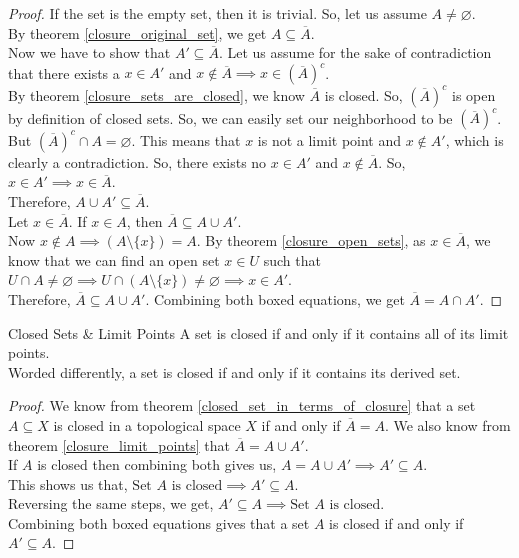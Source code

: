 \begin{proof}
    If the set is the empty set, then it is trivial. So, let us assume $A\neq\varnothing$.\\
    By theorem \eqref{closure_original_set}, we get $A\subseteq \overline{A}$.\\
    Now we have to show that $A'\subseteq \overline{A}$. Let us assume for the sake of contradiction that there exists a $x\in A'$ and $x\notin \overline{A}\implies x\in (\overline{A})^c$.\\ By theorem \eqref{closure_sets_are_closed}, we know $\overline{A}$ is closed. So, $(\overline{A})^c$ is open by definition of closed sets. So, we can easily set our neighborhood to be $(\overline{A})^c$. But $(\overline{A})^c\cap A=\varnothing$. This means that $x$ is not a limit point and $x\notin A'$, which is clearly a contradiction. So, there exists no $x\in A'$ and $x\notin \overline{A}$. So, $x\in A'\implies x\in\overline{A}$.\\
    Therefore, $\boxed{A\cup A'\subseteq\overline{A}}$.\\
    Let $x\in\overline{A}$. If $x\in A$, then $\overline{A}\subseteq A\cup A'$.\\
    Now $x\notin A\implies (A\setminus\{x\})=A$. By theorem \eqref{closure_open_sets}, as $x\in\overline{A}$, we know that we can find an open set $x\in U$ such that $U\cap A\neq\varnothing\implies U\cap(A\setminus\{x\})\neq\varnothing\implies x\in A'$.\\
    Therefore, $\boxed{\overline{A}\subseteq A\cup A'}$.
    Combining both boxed equations, we get $\overline{A}=A\cap A'$.
\end{proof}
\begin{Theorem}{Closed Sets \& Limit Points}\label{closed_sets_limit_points}
    A set is closed if and only if it contains all of its limit points.\\
    Worded differently, a set is closed if and only if it contains its derived set.
\end{Theorem}
\begin{proof}
    We know from theorem \eqref{closed_set_in_terms_of_closure} that a set $A\subseteq X$ is closed in a topological space $X$ if and only if $\overline{A}=A$. We also know from theorem \eqref{closure_limit_points} that $\overline{A}=A\cup A'$.\\
    If $A$ is closed then combining both gives us, $A=A\cup A' \implies A'\subseteq A$.\\
    This shows us that, $\boxed{\text{Set }A\text{ is closed}\implies A'\subseteq A}$.\\
    Reversing the same steps, we get, $\boxed{A'\subseteq A\implies\text{Set }A\text{ is closed}}$.\\
    Combining both boxed equations gives that a set $A$ is closed if and only if $A'\subseteq A$.
\end{proof}
